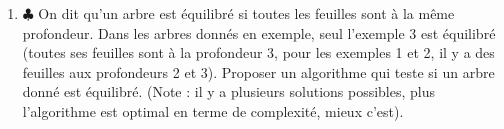 \begin{exercice}
\begin{enumerate}
\item $\clubsuit$ On dit qu'un arbre est équilibré si toutes les feuilles sont à la même profondeur. Dans les arbres donnés en exemple, seul l'exemple 3 est équilibré (toutes ses feuilles sont à la profondeur 3, pour les exemples 1 et 2, il y a des feuilles aux profondeurs 2 et 3). Proposer un algorithme qui teste si un arbre donné est équilibré. (Note : il y a plusieurs solutions possibles, plus l'algorithme est optimal en terme de complexité, mieux c'est).

\end{enumerate}


\end{exercice}